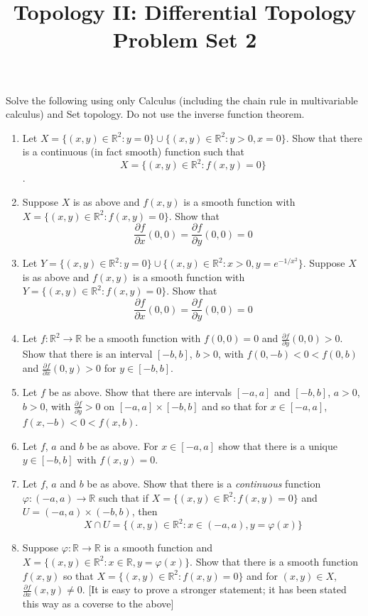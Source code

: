 \documentclass[12pt]{article}
\newcommand{\R}{\mathbb{R}}
\newcommand{\del}{\partial}
\begin{document}
\title{Topology II: Differential Topology\\
Problem Set 2} 
\date{}
\maketitle

\thispagestyle{empty}

Solve the following using only Calculus (including the chain rule in multivariable calculus) and Set topology. Do not use the inverse function theorem. 

\begin{enumerate}

\item Let $X=\{(x,y)\in \R^2: y=0\}\cup \{(x,y)\in\R^2: y>0, x=0\}$. Show that there is a continuous (in fact smooth) function such that 
$$X=\{(x,y)\in\R^2: f(x,y)=0\}$$.

\item Suppose $X$ is as above and $f(x,y)$ is a smooth function with $X=\{(x,y)\in\R^2: f(x,y)=0\}$. Show that
$$\frac{\del f}{\del x}(0,0)=\frac{\del f}{\del y}(0,0)=0$$

\item Let $Y=\{(x,y)\in \R^2: y=0\}\cup \{(x,y)\in\R^2: x>0, y=e^{-1/x^2}\}$. Suppose $X$ is as above and $f(x,y)$ is a smooth function with $Y=\{(x,y)\in\R^2: f(x,y)=0\}$. Show that
$$\frac{\del f}{\del x}(0,0)=\frac{\del f}{\del y}(0,0)=0$$

\item Let $f:\R^2\to \R$ be a smooth function with $f(0,0)=0$ and $\frac{\del f}{\del y}(0,0)>0$. Show that there is an interval $[-b,b]$, $b>0$, with $f(0,-b)<0<f(0,b)$ and $\frac{\del f}{\del x}(0,y)>0$ for $y\in [-b,b]$.

\item Let $f$ be as above. Show that there are intervals $[-a,a]$ and $[-b,b]$, $a>0$, $b>0$, with $\frac{\del f}{\del y}>0$ on $[-a,a]\times [-b,b]$ and so that for $x\in [-a,a]$, $f(x,-b)<0<f(x,b)$.

\item Let $f$, $a$ and $b$ be as above. For $x\in [-a,a]$ show that there is a unique $y\in [-b,b]$ with $f(x,y)=0$.

\item Let $f$, $a$ and $b$ be as above. Show that there is a \emph{continuous} function $\varphi:(-a,a)\to\R$ such that if  $X=\{(x,y)\in\R^2: f(x,y)=0\}$ and $U=(-a,a)\times (-b,b)$, then 
$$X\cap U=\{(x,y)\in\R^2: x\in (-a,a), y=\varphi(x)\}$$

\item Suppose $\varphi:\R\to \R$ is a smooth function and $X=\{(x,y)\in\R^2: x\in \R, y=\varphi(x)\}$. Show that there is a smooth function $f(x,y)$ so that  $X=\{(x,y)\in\R^2: f(x,y)=0\}$  and for $(x,y)\in X$, $\frac{\del f}{\del x}(x,y)\neq 0$. [It is easy to prove a stronger statement; it has been stated this way as a coverse to the above]

\end{enumerate}
\end{document}
